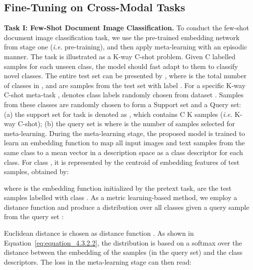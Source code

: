 \documentclass[preprint,review,12pt]{elsarticle}
\newcommand{\ie}{\textit{i.e. }}
\begin{document}
\subsection{Fine-Tuning on Cross-Modal Tasks}
\noindent\textbf{Task I: Few-Shot Document Image Classification.}
To conduct the few-shot document image classification task, we use the pre-trained embedding network from stage one (\ie pre-training), and then apply meta-learning with an episodic manner. The task is illustrated as a K-way C-shot problem. Given C labelled samples for each unseen class, the model should fast adapt to them to classify novel classes. The entire test set can be presented by , where  is the total number of classes in , and  are samples from the test set with label . For a specific K-way C-shot meta-task ,  denotes class labels randomly chosen from dataset . Samples from these classes are randomly chosen to form a Support set and a Query set: (a) the support set for task  is denoted as , which contains C  K samples (\ie K-way  C-shot); (b) the query set is  where  is the number of samples selected for meta-learning. During the meta-learning stage, the proposed model is trained to learn an embedding function to map all input images and text samples from the same class to a mean vector  in a description space as a class descriptor for each class. For class , it is represented by the centroid of embedding features of test samples, obtained by:

where  is the embedding function initialized by the pretext task,  are the test samples labelled with class . As a metric learning-based method, we employ a distance function  and produce a distribution over all classes given a query sample  from the query set :

Euclidean distance is chosen as distance function . As shown in Equation~\ref{eq:equation_4.3.2.2}, the distribution is based on a softmax over the distance between the embedding of the samples (in the query set) and the class descriptors. The loss in the meta-learning stage can then read:
\end{document}

